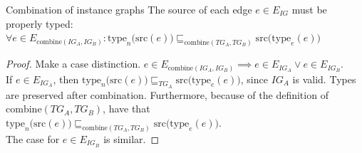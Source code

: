 \begin{frame}{Combination of instance graphs}
The source of each edge $e \in E_{IG}$ must be properly typed:\\
$\forall e \in E_{\mathrm{combine}(IG_A, IG_B)}\!: \mathrm{type}_n \big(\mathrm{src}(e)\big) \sqsubseteq_{\mathrm{combine}(TG_A, TG_B)} \mathrm{src} \big(\mathrm{type}_e(e)\big)$
\pause

\begin{proof}
Make a case distinction. $e \in E_{\mathrm{combine}(IG_A, IG_B)} \implies e \in E_{IG_A} \lor e \in E_{IG_B}$.\\
\vspace{0.2cm}
If $e \in E_{IG_A}$, then $\mathrm{type}_n \big(\mathrm{src}(e)\big) \sqsubseteq_{TG_{A}} \mathrm{src} \big(\mathrm{type}_e(e)\big)$, since $IG_A$ is valid. Types are preserved after combination.
Furthermore, because of the definition of $\mathrm{combine}(TG_A, TG_B)$, have that $\mathrm{type}_n \big(\mathrm{src}(e)\big) \sqsubseteq_{\mathrm{combine}(TG_A, TG_B)} \mathrm{src} \big(\mathrm{type}_e(e)\big)$.\\
\vspace{0.2cm}
The case for $e \in E_{IG_B}$ is similar.
\end{proof}
\end{frame}


